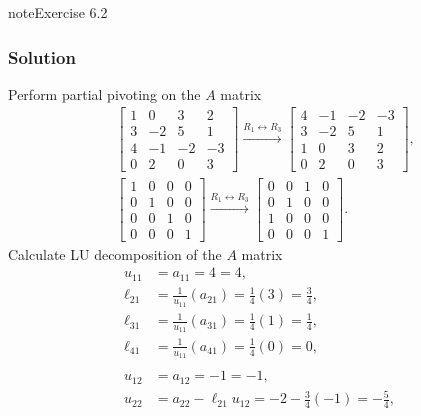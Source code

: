 \documentclass[letterpaper,10pt,english]{jupyterBook}
\begin{document}
\begin{sphinxadmonition}{note}{Exercise 6.2}
\subsubsection*{Solution}

\sphinxAtStartPar
Perform partial pivoting on the \(A\) matrix
\begin{align*}
    & \left[\begin{matrix}1 & 0 & 3 & 2\\3 & -2 & 5 & 1\\4 & -1 & -2 & -3\\0 & 2 & 0 & 3\end{matrix}\right]
    \xrightarrow{R_{1} \leftrightarrow R_{3}}
    \left[\begin{matrix}4 & -1 & -2 & -3\\3 & -2 & 5 & 1\\1 & 0 & 3 & 2\\0 & 2 & 0 & 3\end{matrix}\right]
    , \\
    & \left[\begin{matrix}1 & 0 & 0 & 0\\0 & 1 & 0 & 0\\0 & 0 & 1 & 0\\0 & 0 & 0 & 1\end{matrix}\right]
    \xrightarrow{R_{1} \leftrightarrow R_{3}}
    \left[\begin{matrix}0 & 0 & 1 & 0\\0 & 1 & 0 & 0\\1 & 0 & 0 & 0\\0 & 0 & 0 & 1\end{matrix}\right]
.
\end{align*}
\sphinxAtStartPar
Calculate LU decomposition of the \(A\) matrix
\begin{align*}
    u_{11} &= a_{11} = 4 = 4, \\
    \ell_{21} &= \frac{1}{u_{11}}\left(a_{21}\right) = \frac{1}{4}\left(3\right) = \frac{3}{4}, \\
    \ell_{31} &= \frac{1}{u_{11}}\left(a_{31}\right) = \frac{1}{4}\left(1\right) = \frac{1}{4}, \\
    \ell_{41} &= \frac{1}{u_{11}}\left(a_{41}\right) = \frac{1}{4}\left(0\right) = 0, \\
    \\
    u_{12} &= a_{12} = -1 = -1, \\
    u_{22} &= a_{22} - \ell_{21} u_{12} = -2 - \frac{3}{4}\left(-1\right) = - \frac{5}{4}, \\

\end{align*}
\end{sphinxadmonition}
\end{document}
